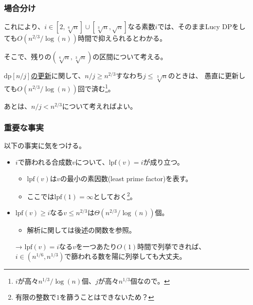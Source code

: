 \documentclass[
  lualatex,
  ja=standard,
  compress,
  hyperref={colorlinks, urlcolor=magenta, linkcolor=blue!55!black},
  dvipsnames,
  svgnames,
]{beamer}
\newcommand{\DP}{\mathrm{dp}}
\newcommand{\lpf}[1]{\mathrm{lpf}(#1)}
\begin{document}
\begin{frame}
  \frametitle{場合分け}

  これにより、$i\in[2, \sqrt[6]{n}]\cup[\sqrt[3]{n}, \sqrt{n}]$なる素数$i$では、そのままLucy DPをしても$O(n^{2/3}/\log(n))$時間で抑えられるとわかる。

  そこで、残りの$(\sqrt[6]{n}, \sqrt[3]{n})$の区間について考える。

  \hyperlink{frame:lucy-code}{$\DP[n/j]$の更新}に関して、$n/j\ge n^{2/3}$すなわち$j\le \sqrt[3]{n}$のときは、
  愚直に更新しても$O(n^{2/3}/\log(n))$回で済む\footnote{$i$が高々$n^{1/3}/\log(n)$個、$j$が高々$n^{1/3}$個なので。}。

  あとは、$n/j<n^{2/3}$について考えればよい。
\end{frame}

\begin{frame}
  \frametitle{重要な事実}

  以下の事実に気をつける。
  \begin{itemize}
  \item $i$で篩われる合成数$v$について、$\lpf{v} = i$が成り立つ。
    \begin{itemize}
    \item $\lpf{v}$は$v$の最小の素因数(least prime factor)を表す。
    \item ここでは$\lpf{1} = \infty$としておく\footnote{有限の整数で$1$を篩うことはできないため？}。
    \end{itemize}
  \item $\lpf{v}\ge i$なる$v\le n^{2/3}$は$\Theta(n^{2/3}/\log(n))$個。
    \begin{itemize}
    \item 解析に関しては後述の関数を参照。
    \end{itemize}
  \end{itemize}

  \begin{itemize}
  \item[→] $\lpf{v} = i$なる$v$を一つあたり$O(1)$時間で列挙できれば、
    $i\in(n^{1/6}, n^{1/3})$で篩われる数を陽に列挙しても大丈夫。
  \end{itemize}
\end{frame}
\end{document}
